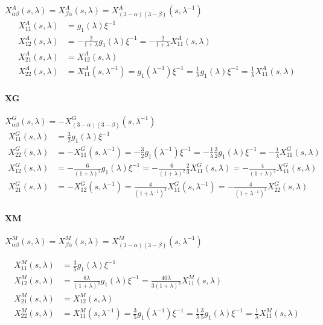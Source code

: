 \documentclass[11pt]{scrartcl}
\begin{document}
$X_{\alpha\beta}^{A}(s,\lambda)=X_{\beta\alpha}^{A}(s,\lambda) =
X_{(3-\alpha)(3-\beta)}^{A}(s,\lambda^{-1})$
\begin{align}
 X_{11}^{A}(s,\lambda) &= g_1 (\lambda) \xi^{-1} \\
 X_{12}^{A}(s,\lambda) &= - \frac{2}{1+\lambda} g_1 (\lambda) \xi^{-1} 
= -\frac{2}{1+\lambda} X_{11}^{A}(s,\lambda) \\
 X_{21}^{A}(s,\lambda) &=  X_{12}^{A}(s,\lambda) \\
 X_{22}^{A}(s,\lambda) &=  X_{11}^{A}(s,\lambda^{-1}) 
 = g_1(\lambda^{-1})\xi^{-1}
 = \frac{1}{\lambda} g_1(\lambda) \xi^{-1}
 = \frac{1}{\lambda} X_{11}^{A}(s,\lambda) 
\end{align}

\paragraph{XG}
$X_{\alpha\beta}^{G}(s,\lambda) = - X_{(3-\alpha)(3-\beta)}^{G}(s, \lambda^{-1})$
\begin{align}
 X_{11}^{G}(s,\lambda) &= \frac{3}{2}g_1(\lambda) \xi^{-1} \\
 X_{22}^{G}(s,\lambda) &= - X_{11}^{G} (s, \lambda^{-1})
 = - \frac{3}{2}g_1(\lambda^{-1}) \xi^{-1} 
 = - \frac{1}{\lambda} \frac{3}{2}g_1(\lambda) \xi^{-1} 
 = - \frac{1}{\lambda} X_{11}^{G} (s, \lambda) \\
X_{12}^{G}(s,\lambda) &= 
-\frac{6}{(1+\lambda)^2} g_1(\lambda)\xi^{-1} 
= 
-\frac{6}{(1+\lambda)^2} \frac{2}{3} X_{11}^{G}(s,\lambda)
= 
-\frac{4}{(1+\lambda)^2}  X_{11}^{G} (s,\lambda)\\
X_{21}^{G}(s,\lambda) &= 
- X_{12}^{G}(s,\lambda^{-1}) 
= 
\frac{4}{(1+\lambda^{-1})^2}X_{11}^{G}(s,\lambda^{-1})
= 
-\frac{4}{(1+\lambda^{-1})^2}X_{22}^{G}(s,\lambda)
\end{align}

\paragraph{XM}

$X_{\alpha\beta}^{M} (s,\lambda) = 
 X_{\beta\alpha}^{M}(s,\lambda) = 
 X_{(3-\alpha)(3-\beta)}^{M}(s, \lambda^{-1})$

\begin{align}
X_{11}^{M}(s,\lambda)  &= 
\frac{3}{5} g_1(\lambda)\xi^{-1} \\
X_{12}^{M}(s,\lambda)
&= \frac{8\lambda}{(1+\lambda)^3} g_1(\lambda)\xi^{-1} 
= \frac{40\lambda}{3(1+\lambda)^3}  X_{11}^{M}(s,\lambda) \\
X_{21}^{M}(s,\lambda) & = X_{12}^{M}(s,\lambda) \\
X_{22}^{M}(s,\lambda) & = 
X_{11}^{M}(s,\lambda^{-1}) 
=
\frac{3}{5} g_1(\lambda^{-1})\xi^{-1} 
=
\frac{1}{\lambda}
\frac{3}{5} g_1(\lambda)\xi^{-1} 
=
\frac{1}{\lambda}
X_{11}^{M}(s,\lambda)  
\end{align}
\end{document}
